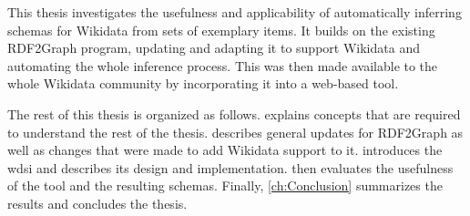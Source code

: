 
This thesis investigates the usefulness and applicability
of automatically inferring \glspl{schema} for \gls{Wikidata} from sets of exemplary \glspl{item}.
It builds on the existing RDF2Graph \cite{vanDam2015} program,
updating and adapting it to support \gls{Wikidata}
and automating the whole inference process.
This was then made available to the whole \gls{Wikidata} community %
by incorporating it into a web-based tool.

The rest of this thesis
is organized as follows.
 explains concepts that are required
to understand the rest of the thesis.
 describes general updates for RDF2Graph
as well as changes that were made to add \gls{Wikidata} support to it.
 introduces the \gls{wdsi}
and describes its design and implementation.
 then evaluates the usefulness of the tool and the resulting \glspl{schema}.
Finally, \cref{ch:Conclusion} summarizes the results and concludes the thesis.

